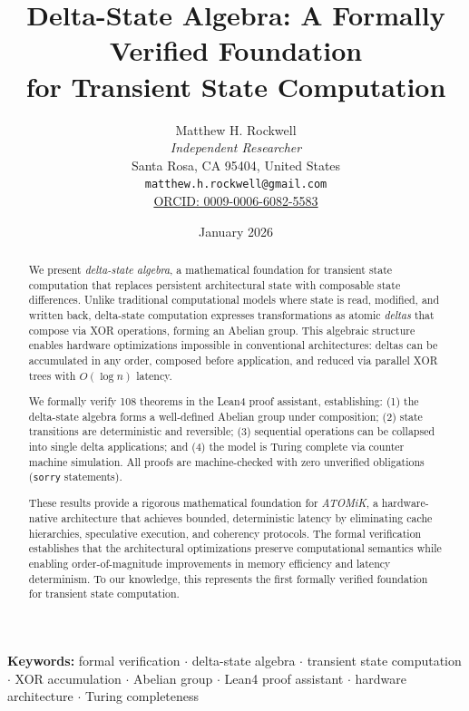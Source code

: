 \documentclass[11pt,letterpaper]{article}
\title{Delta-State Algebra: A Formally Verified Foundation\\for Transient State Computation}
\author{
  Matthew H. Rockwell\\
  \textit{Independent Researcher}\\
  Santa Rosa, CA 95404, United States\\
  \texttt{matthew.h.rockwell@gmail.com}\\
  \href{https://orcid.org/0009-0006-6082-5583}{ORCID: 0009-0006-6082-5583}
}
\date{January 2026}
\theoremstyle{plain}
\theoremstyle{definition}
\theoremstyle{remark}
\begin{document}
\maketitle

\begin{abstract}
We present \emph{delta-state algebra}, a mathematical foundation for transient state computation that replaces persistent architectural state with composable state differences. Unlike traditional computational models where state is read, modified, and written back, delta-state computation expresses transformations as atomic \emph{deltas} that compose via XOR operations, forming an Abelian group. This algebraic structure enables hardware optimizations impossible in conventional architectures: deltas can be accumulated in any order, composed before application, and reduced via parallel XOR trees with $O(\log n)$ latency.

We formally verify 108 theorems in the Lean4 proof assistant, establishing: (1) the delta-state algebra forms a well-defined Abelian group under composition; (2) state transitions are deterministic and reversible; (3) sequential operations can be collapsed into single delta applications; and (4) the model is Turing complete via counter machine simulation. All proofs are machine-checked with zero unverified obligations (\texttt{sorry} statements).

These results provide a rigorous mathematical foundation for \emph{ATOMiK}, a hardware-native architecture that achieves bounded, deterministic latency by eliminating cache hierarchies, speculative execution, and coherency protocols. The formal verification establishes that the architectural optimizations preserve computational semantics while enabling order-of-magnitude improvements in memory efficiency and latency determinism. To our knowledge, this represents the first formally verified foundation for transient state computation.
\end{abstract}

\medskip
\noindent\textbf{Keywords:} formal verification \(\cdot\) delta-state algebra \(\cdot\) transient state computation \(\cdot\) XOR accumulation \(\cdot\) Abelian group \(\cdot\) Lean4 proof assistant \(\cdot\) hardware architecture \(\cdot\) Turing completeness

\end{document}

